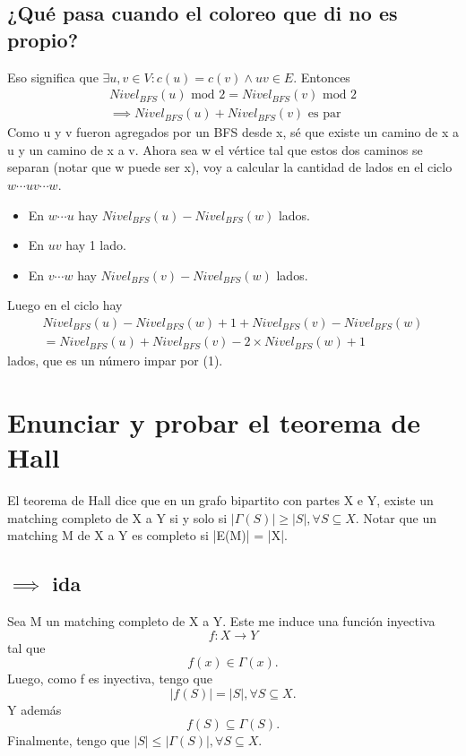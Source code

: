 \documentclass[11pt]{article}
\begin{document}
\subsection*{¿Qué pasa cuando el coloreo que di no es propio?}
\label{sec:org9cefb89}
Eso significa que \(\exists u,v \in V : c(u) = c(v) \land uv \in E\). Entonces
\begin{align*}
Nivel_{BFS}(u) \text{ mod 2} = Nivel_{BFS}(v) \text{ mod 2} \\
\implies Nivel_{BFS}(u) + Nivel_{BFS}(v) \text{ es par} \tag{1}
\end{align*}
Como u y v fueron agregados por un BFS desde x, sé que existe un camino de x a u y un camino de x a v. Ahora sea w el vértice tal que estos dos caminos se separan (notar que w puede ser x), voy a calcular la cantidad de lados en el ciclo \({w \cdots u v \cdots w}\).
\begin{itemize}
\item En \(w \cdots u\) hay \(Nivel_{BFS}(u) - Nivel_{BFS}(w)\) lados.
\item En \(uv\) hay 1 lado.
\item En \(v \cdots w\) hay \(Nivel_{BFS}(v) - Nivel_{BFS}(w)\) lados.
\end{itemize}
Luego en el ciclo hay
\begin{align*}
Nivel_{BFS}(u) - Nivel_{BFS}(w) + 1 + Nivel_{BFS}(v) - Nivel_{BFS}(w) \\
= Nivel_{BFS}(u) + Nivel_{BFS}(v) - 2 \times Nivel_{BFS}(w) + 1
\end{align*}
lados, que es un número impar por (1).


\section{Enunciar y probar el teorema de Hall}
\label{sec:org0fc65b9}
El teorema de Hall dice que en un grafo bipartito con partes X e Y, existe un matching completo de X a Y si y solo si \({|\Gamma(S)| \ge |S|, \forall S \subseteq X}\). Notar que un matching M de X a Y es completo si |E(M)| = |X|.

\subsection*{\(\implies\) ida}
\label{sec:org5b9361b}
Sea M un matching completo de X a Y. Este me induce una función inyectiva \[f: X \rightarrow Y\] tal que \[f(x) \in \Gamma(x).\] Luego, como f es inyectiva, tengo que \[|f(S)| = |S|, \forall S \subseteq X.\]
Y además \[f(S) \subseteq \Gamma(S).\]
Finalmente, tengo que \(|S| \le |\Gamma(S)|, \forall S \subseteq X\).
\end{document}
